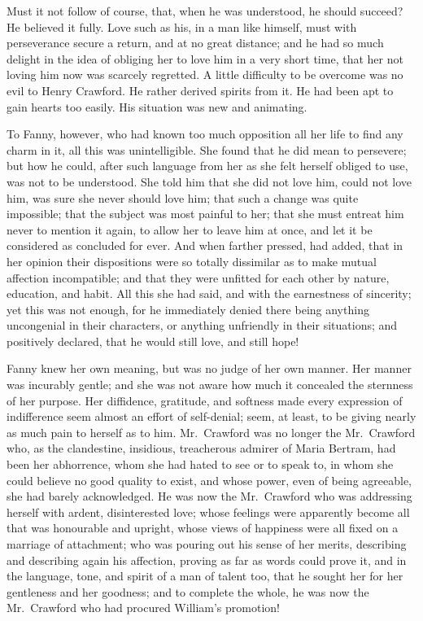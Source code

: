 Must it not follow of course, that, when he was understood,
he should succeed?  He believed it fully.  Love such as his,
in a man like himself, must with perseverance secure a return,
and at no great distance; and he had so much delight in
the idea of obliging her to love him in a very short time,
that her not loving him now was scarcely regretted.
A little difficulty to be overcome was no evil to
Henry Crawford.  He rather derived spirits from it.
He had been apt to gain hearts too easily.  His situation
was new and animating.

To Fanny, however, who had known too much opposition all her
life to find any charm in it, all this was unintelligible.
She found that he did mean to persevere; but how he could,
after such language from her as she felt herself obliged
to use, was not to be understood.  She told him that she
did not love him, could not love him, was sure she never
should love him; that such a change was quite impossible;
that the subject was most painful to her; that she must
entreat him never to mention it again, to allow her to leave
him at once, and let it be considered as concluded for ever.
And when farther pressed, had added, that in her opinion
their dispositions were so totally dissimilar as to make
mutual affection incompatible; and that they were unfitted
for each other by nature, education, and habit.  All this
she had said, and with the earnestness of sincerity;
yet this was not enough, for he immediately denied there
being anything uncongenial in their characters, or anything
unfriendly in their situations; and positively declared,
that he would still love, and still hope!

Fanny knew her own meaning, but was no judge of her own manner.
Her manner was incurably gentle; and she was not aware
how much it concealed the sternness of her purpose.
Her diffidence, gratitude, and softness made every expression
of indifference seem almost an effort of self-denial;
seem, at least, to be giving nearly as much pain to herself
as to him.  Mr.\ Crawford was no longer the Mr.\ Crawford who,
as the clandestine, insidious, treacherous admirer of
Maria Bertram, had been her abhorrence, whom she had hated
to see or to speak to, in whom she could believe no good
quality to exist, and whose power, even of being agreeable,
she had barely acknowledged.  He was now the Mr.\ Crawford
who was addressing herself with ardent, disinterested love;
whose feelings were apparently become all that was
honourable and upright, whose views of happiness were all
fixed on a marriage of attachment; who was pouring out
his sense of her merits, describing and describing again
his affection, proving as far as words could prove it,
and in the language, tone, and spirit of a man of talent too,
that he sought her for her gentleness and her goodness;
and to complete the whole, he was now the Mr.\ Crawford
who had procured William's promotion!

